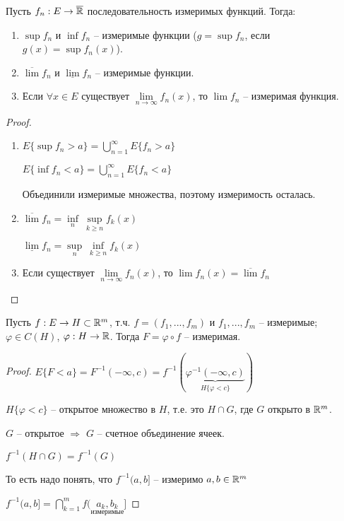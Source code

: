 \begin{theorem}
    Пусть $f_n:E\rightarrow\overline{\mathbb{R}}$ последовательность измеримых функций. Тогда:

    \begin{enumerate}
        \item $\sup f_n$ и $\inf f_n$ – измеримые функции ($g=\sup f_n$, если $g(x)=\sup f_n(x)$).
        \item $\overline{\lim} f_n$ и $\underline{\lim} f_n$ – измеримые функции.
        \item Если $\forall x\in E$ существует $\lim\limits_{n\rightarrow \infty} f_n(x)$, то $\lim f_n$ – измеримая функция.
    \end{enumerate}
\end{theorem}

\begin{proof}~
    \begin{enumerate}
        \item $E\{\sup f_n > a\}=\bigcup\limits_{n=1}^\infty E\{f_n > a\}$
        
        
        $E\{\inf f_n < a\}=\bigcup\limits_{n=1}^\infty E\{f_n < a\}$

        Объединили измеримые множества, поэтому измеримость осталась.

        \item $\overline{\lim} f_n =\underset{n}{\inf}\ \underset{k\geq n}{\sup} f_k(x)$
        
        $\underline{\lim} f_n =\underset{n}{\sup}\ \underset{k\geq n}{\inf} f_k(x)$

        \item Если существует $\lim\limits_{n\rightarrow \infty} f_n(x)$, то $\lim f_n(x) =\overline{\lim} f_n$
    \end{enumerate}
\end{proof}

\begin{theorem}
    Пусть $f:E\rightarrow H \subset \mathbb{R}^m$, т.ч. $f=(f_1, ..., f_m)$ и $f_1, ..., f_m$ – измеримые;
    $\varphi \in C(H)$, $\varphi: H \rightarrow \mathbb{R}$. Тогда $F=\varphi \circ f$ – измеримая.
\end{theorem}

\begin{proof}
    $E\{F < a\}= F^{-1}(-\infty, c)= f^{-1}(\underbrace{\varphi^{-1}(-\infty, c)}_{H\{\varphi < c\}})$

    $H\{\varphi < c\}$ – открытое множество в $H$, т.е. это $H\cap G$, где $G$ 
    открыто в $\mathbb{R}^m$.

    $G$ – открытое $\Rightarrow$ $G$ – счетное объединение ячеек.

    $f^{-1}(H\cap G)= f^{-1}(G)$

    То есть надо понять, что $f^{-1}(a, b]$ – измеримо $a, b\in \mathbb{R}^m$

    $f^{-1}(a, b]=\bigcap\limits_{k=1}^m f(\underset{\text{измеримые}}{a_k, b_k}]$
\end{proof}

